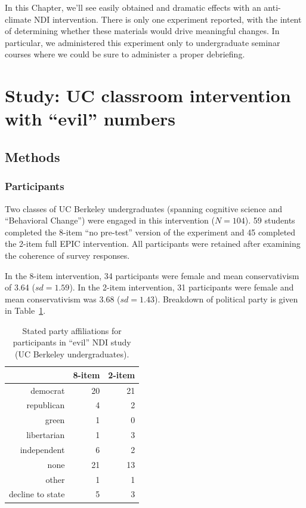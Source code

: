 In this Chapter, we'll see easily obtained and dramatic effects with an
anti-climate NDI intervention. There is only one experiment reported, with the
intent of determining whether these materials would drive meaningful
changes. In particular, we administered this experiment only to undergraduate
seminar courses where we could be sure to administer a proper debriefing.

\section{Study: UC classroom intervention with \texorpdfstring{“evil”}{"evil"}
    numbers}

\subsection{Methods} 
\label{sec:evilndi-methods}

\subsubsection{Participants}
\label{sec:evil-participants}

Two classes of UC Berkeley undergraduates (spanning cognitive science and
“Behavioral Change”) were engaged in this intervention ($N=104$). 59 students
completed the 8-item “no pre-test” version of the experiment and 45 completed
the 2-item full EPIC intervention. All participants were retained after
examining the coherence of survey responses.

In the 8-item intervention, 34 participants were female and mean conservativism
of 3.64 ($sd=1.59$). In the 2-item intervention, 31 participants were female and
mean conservativism was 3.68 ($sd=1.43$). Breakdown of political party is given
in Table~\ref{table:evil-party}.

\begin{table}[ht]
\caption{Stated party affiliations for participants in “evil” NDI study (UC
    Berkeley undergraduates).}
\label{table:evil-party}
\centering
\begin{tabular}{rrr}
  \toprule
     & 8-item & 2-item \\ 
  \midrule
  democrat &  20 &  21 \\ 
  republican &   4 &   2 \\ 
  green &   1 &   0 \\ 
  libertarian &   1 &   3 \\ 
  independent &   6 &   2 \\ 
  none &  21 &  13 \\ 
  other &   1 &   1 \\ 
  decline to state &   5 &   3 \\ 
   \bottomrule
\end{tabular}
\end{table}

